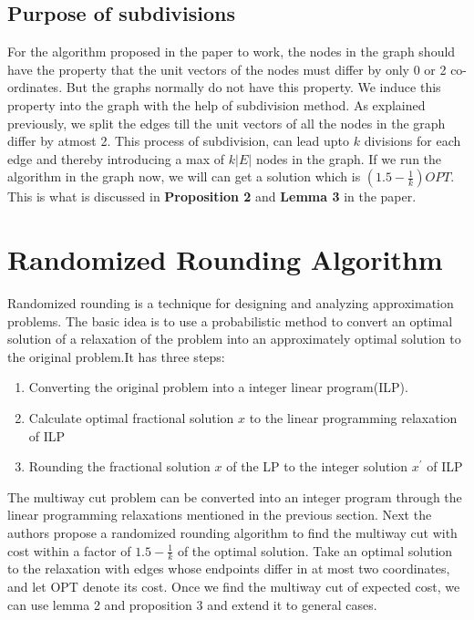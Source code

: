 \documentclass[11pt]{article}
\begin{document}
\subsection{Purpose of subdivisions}
For the algorithm proposed in the paper to work, the nodes in the graph should have the property that the unit vectors of the nodes must differ by only 0 or 2 co-ordinates. But the graphs normally do not have this property. We induce this property into the graph with the help of subdivision method. As explained previously, we split the edges till the unit vectors of all the nodes in the graph differ by atmost 2. This process of subdivision, can lead upto $k$ divisions for each edge and thereby introducing a max of $k\vert E \vert$ nodes in the graph. If we run the algorithm in the graph now, we will can get a solution which is $(1.5 - \frac{1}{k})OPT$. This is what is discussed in \textbf{Proposition 2} and \textbf{Lemma 3} in the paper. 

\section{Randomized Rounding Algorithm}
Randomized rounding is a technique for designing and analyzing approximation problems. The basic idea is to use a probabilistic method to convert an optimal solution of a relaxation of the problem into an approximately optimal solution to the original problem.It has three steps:
\begin{enumerate} \itemsep -3pt
\item Converting the original problem into a integer linear program(ILP).
\item Calculate optimal fractional solution $x$ to the linear programming relaxation of  ILP
\item Rounding the fractional solution $x$ of the LP to the integer solution $x^{'}$ of ILP 
\end{enumerate}

The multiway cut problem can be converted into an integer program through the linear programming relaxations mentioned in the previous section. Next the authors propose a randomized rounding algorithm to find the multiway cut with cost within a factor of $1.5 - \frac{1}{k}$ of the optimal solution. Take an optimal solution to the relaxation with edges whose endpoints differ in at most two coordinates, and let OPT denote its cost. Once we find the multiway cut of expected cost, we can use lemma 2 and proposition 3 and extend it to general cases.\\
\vspace{-10pt}
  
\end{document}
